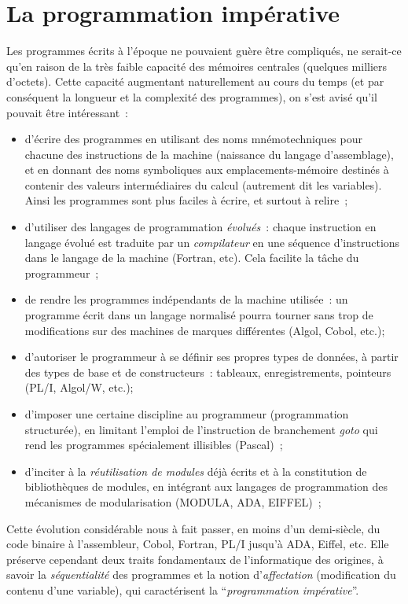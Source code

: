 \section{La programmation impérative}

Les programmes écrits à l'époque ne pouvaient guère être
compliqués, ne serait-ce qu'en raison de la très faible capacité des
mémoires centrales (quelques milliers d'octets).  Cette capacité
augmentant naturellement au cours du temps (et par conséquent la
longueur et la complexité des programmes), on s'est avisé qu'il
pouvait être intéressant~:

\begin{itemize}

\item d'écrire des programmes en utilisant des noms mnémotechniques 
pour chacune des instructions de la machine (naissance du langage
d'assemblage), et en donnant des noms symboliques aux
emplacements-mémoire destinés à contenir des valeurs intermédiaires
du calcul (autrement dit les variables). Ainsi les programmes sont
plus faciles à écrire, et surtout à relire~;


\item d'utiliser des langages de programmation {\em évolués}~: chaque
instruction en langage évolué est traduite par un \emph{compilateur}
en une séquence d'instructions dans le langage de la machine (Fortran,
etc). Cela facilite la tâche du programmeur~;
\item de rendre les programmes indépendants de la machine utilisée~: un programme écrit dans un langage normalisé pourra tourner sans trop de modifications sur des machines de marques différentes  (Algol, Cobol, etc.);
\item d'autoriser le programmeur à se définir ses propres types de
données, à partir des types de base et de constructeurs~: tableaux,
enregistrements, pointeurs (PL/I, Algol/W, etc.); \item d'imposer une
certaine discipline au programmeur (programmation structurée), en
limitant l'emploi de l'instruction de branchement {\em goto} qui rend
les programmes spécialement illisibles (Pascal)~;
\item d'inciter à la \emph{réutilisation de modules} déjà écrits et à
la constitution de bibliothèques de modules, en intégrant aux langages
de programmation des mécanismes de modularisation (MODULA, ADA,
EIFFEL)~;
\end{itemize}

Cette évolution considérable nous à fait passer, en moins d'un
demi-siècle, du code binaire à l'assembleur, Cobol, Fortran, PL/I
jusqu'à ADA, Eiffel, etc. Elle préserve cependant deux traits
fondamentaux de l'informatique des origines, à savoir la {\em
séquentialité} des programmes et la notion d'{\em affectation}
(modification du contenu d'une variable), qui caractérisent la
``\emph{programmation impérative}''.


